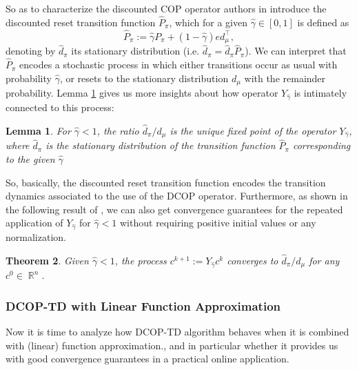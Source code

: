 \documentclass[12pt,a4paper,openright,twoside]{article}
\DeclareMathOperator*{\R}{\mathbb{R}}
\numberwithin{equation}{section}
\newtheorem{theorem}{Theorem}[section]
\newtheorem{lemma}[theorem]{Lemma}
\theoremstyle{definition}
\theoremstyle{remark}
\theoremstyle{plain}
\begin{document}
So as to characterize the discounted COP operator authors in \cite{DCOPTD} introduce the discounted reset transition function $\hat{P}_\pi$, which for a given $\hat{\gamma}\in [0,1]$ is defined as
\begin{equation*}
		\hat{P}_\pi := \hat{\gamma} P_\pi + (1 - \hat{\gamma})ed_\mu^\top,
\end{equation*}
denoting by $\hat{d}_\pi$ its stationary distribution (i.e. $\hat{d}_\pi = \hat{d}_\pi \hat{P}_\pi$).
We can interpret that $\hat{P}_\pi$ encodes a stochastic process in which either transitions occur as usual with probability $\hat{\gamma}$, or resets to the stationary distribution $d_\mu$ with the remainder probability. %
Lemma \ref{fixedPointDCOPTD} gives us more insights about how operator $Y_{\hat{\gamma}}$ is intimately connected to this process:

\begin{lemma} \label{fixedPointDCOPTD}
	For $\hat{\gamma}<1$, the ratio $\hat{d}_\pi / d_\mu$ is the unique fixed point of the operator $Y_{\hat{\gamma}}$, where $\hat{d}_\pi$ is the stationary distribution of the transition function $\hat{P}_\pi$ corresponding to the given $\hat{\gamma}$
\end{lemma}

So, basically, the discounted reset transition function encodes the transition dynamics associated to the use of the DCOP operator. Furthermore, as shown in the following result of \cite{DCOPTD}, we can also get convergence guarantees for the repeated application of $Y_{\hat{\gamma}}$ for $\hat{\gamma} < 1$ without requiring positive initial values or any normalization.

\begin{theorem} \label{convergenceDCOPTD}
	Given $\hat{\gamma} < 1$, the process $c^{k+1} := Y_{\hat{\gamma}} c^k$ converges to $\hat{d}_\pi / d_\mu$ for any $c^0 \in \R^n$.%
\end{theorem}



\subsubsection*{DCOP-TD with Linear Function Approximation}

Now it is time to analyze how DCOP-TD algorithm behaves when it is combined with (linear) function approximation., and in particular whether it provides us with good convergence guarantees in a practical online application.
\end{document}

